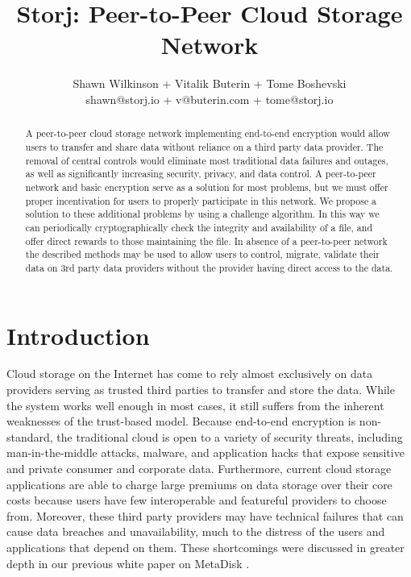 \documentclass[a4paper,10pt]{article}
\begin{document}
\lstset{basicstyle=\ttfamily\footnotesize,breaklines=true}
\lstset{numbers=left, numberstyle=\tiny, stepnumber=1, numbersep=5pt}
\lstset{language=TeX}

\title{\large \bf Storj:  Peer-to-Peer Cloud Storage Network}
\author{\small Shawn Wilkinson + Vitalik Buterin + Tome Boshevski\\ \small shawn@storj.io + v@buterin.com + tome@storj.io\\ }
\maketitle
\begin{abstract}
A peer-to-peer cloud storage network implementing end-to-end encryption would allow users to transfer and share data without reliance on a third party data provider. The removal of central controls would eliminate most traditional data failures and outages, as well as significantly increasing security, privacy, and data control. A peer-to-peer network and basic encryption serve as a solution for most problems, but we must offer proper incentivation for users to properly participate in this network. We propose a solution to these additional problems by using a challenge algorithm. In this way we can periodically cryptographically check the integrity and availability of a file, and offer direct rewards to those maintaining the file. In absence of a peer-to-peer network the described methods may be used to allow users to control, migrate, validate their data on 3rd party data providers without the provider having direct access to the data. 
\end{abstract}

\section{Introduction}
Cloud storage on the Internet has come to rely almost exclusively on data providers serving as trusted third parties to transfer and store the data. While the system works well enough in most cases, it still suffers from the inherent weaknesses of the trust-based model. Because end-to-end encryption is non-standard, the traditional cloud is open to a variety of security threats, including man-in-the-middle attacks, malware, and application hacks that expose sensitive and private consumer and corporate data. Furthermore, current cloud storage applications are able to charge large premiums on data storage over their core costs because users have few interoperable and featureful providers to choose from. Moreover, these third party providers may have technical failures that can cause data breaches and unavailability, much to the distress of the users and applications that depend on them. These shortcomings were discussed in greater depth in our previous white paper on MetaDisk \cite{1}.\\
\end{document}
